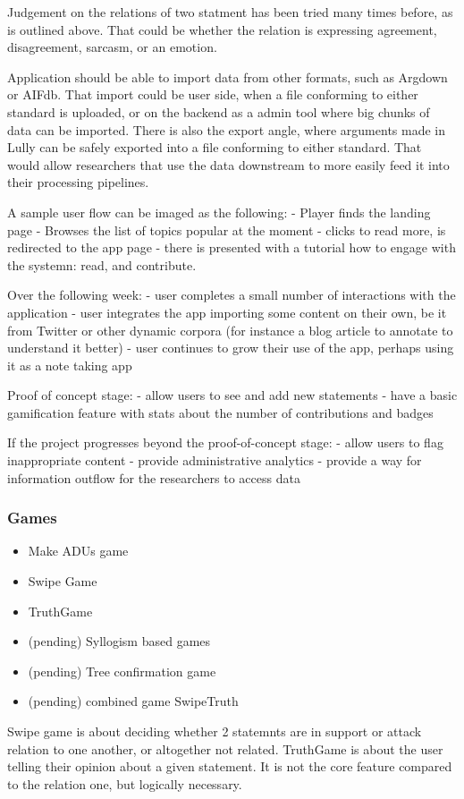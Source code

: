 \documentclass{report}
\begin{document}
Judgement on the relations of two statment has been tried many times before, as is outlined above. That could be whether the relation is expressing agreement, disagreement, sarcasm, or an emotion.

Application should be able to import data from other formats, such as Argdown or AIFdb. That import could be user side, when a file conforming to either standard is uploaded, or on the backend as a admin tool where big chunks of data can be imported.
There is also the export angle, where arguments made in Lully can be safely exported into a file conforming to either standard. That would allow researchers that use the data downstream to more easily feed it into their processing pipelines.

A sample user flow can be imaged as the following:
- Player finds the landing page
- Browses the list of topics popular at the moment
- clicks to read more, is redirected to the app page
- there is presented with a tutorial how to engage with the systemn: read, and contribute.

Over the following week:
- user completes a small number of interactions with the application
- user integrates the app importing some content on their own, be it from Twitter or other dynamic corpora (for instance a blog article to annotate to understand it better)
- user continues to grow their use of the app, perhaps using it as a note taking app

Proof of concept stage:
- allow users to see and add new statements
- have a basic gamification feature with stats about the number of contributions and badges

If the project progresses beyond the proof-of-concept stage:
- allow users to flag inappropriate content
- provide administrative analytics 
- provide a way for information outflow for the researchers to access data

\subsubsection{Games}
\begin{itemize}
  \item Make ADUs game
  \item Swipe Game
  \item TruthGame 
  \item (pending) Syllogism based games
  \item (pending) Tree confirmation game
  \item (pending) combined game SwipeTruth
\end{itemize}
Swipe game is about deciding whether 2 statemnts are in support or attack relation to one another, or altogether not related.
TruthGame is about the user telling their opinion about a given statement. It is not the core feature compared to the relation one, but logically necessary.
\end{document}
